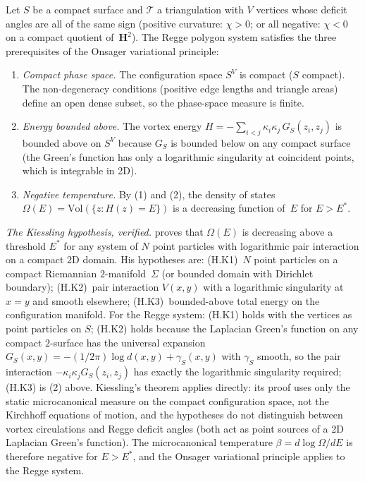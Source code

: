 \begin{lemma}
\label{lem:onsager-regge}
Let $S$ be a compact surface and $\mathcal{T}$ a
triangulation with $V$ vertices whose deficit angles
are all of the same sign
(positive curvature: $\chi > 0$; or all negative:
$\chi < 0$ on a compact quotient of~$\mathbf{H}^2$).
The Regge polygon system satisfies the three prerequisites
of the Onsager variational principle:
\begin{enumerate}
\item \emph{Compact phase space.}
  The configuration space $S^V$ is compact ($S$ compact).
  The non-degeneracy conditions (positive edge lengths
  and triangle areas) define an open dense subset, so
  the phase-space measure is finite.
\item \emph{Energy bounded above.}
  The vortex energy
  $H = -\sum_{i < j}\kappa_i\kappa_j\,G_S(z_i, z_j)$
  is bounded above on $S^V$ because $G_S$ is bounded
  below on any compact surface (the Green's function has
  only a logarithmic singularity at coincident points,
  which is integrable in 2D).
\item \emph{Negative temperature.}
  By (1) and (2), the density of states
  $\Omega(E) = \mathrm{Vol}(\{z : H(z) = E\})$
  is a decreasing function of~$E$ for $E > E^*$.
\end{enumerate}

\emph{The Kiessling hypothesis, verified.}
\citet{Kiessling1993} proves
that $\Omega(E)$ is decreasing above a threshold $E^*$ for
any system of $N$ point particles with logarithmic
pair interaction on a compact $2$D domain.
His hypotheses are:
(H.K1)~$N$ point particles on a compact Riemannian
$2$-manifold~$\Sigma$ (or bounded domain with Dirichlet
boundary);
(H.K2)~pair interaction $V(x,y)$ with a logarithmic
singularity at $x = y$ and smooth elsewhere;
(H.K3)~bounded-above total energy on the configuration
manifold.
For the Regge system: (H.K1) holds with the vertices as
point particles on $S$; (H.K2) holds because the Laplacian
Green's function on any compact $2$-surface has the
universal expansion
$G_S(x,y) = -(1/2\pi)\log d(x,y) + \gamma_S(x,y)$
with $\gamma_S$ smooth, so the pair interaction
$-\kappa_i\kappa_j G_S(z_i,z_j)$ has exactly the logarithmic
singularity required; (H.K3) is (2) above.
Kiessling's theorem applies directly: its proof uses only
the static microcanonical measure on the compact
configuration space, not the Kirchhoff equations of motion,
and the hypotheses do not distinguish between vortex
circulations and Regge deficit angles (both act as
point sources of a 2D Laplacian Green's function).
The microcanonical temperature
$\beta = d\log\Omega/dE$ is therefore negative for
$E > E^*$, and the Onsager variational principle applies
to the Regge system.
\end{lemma}

